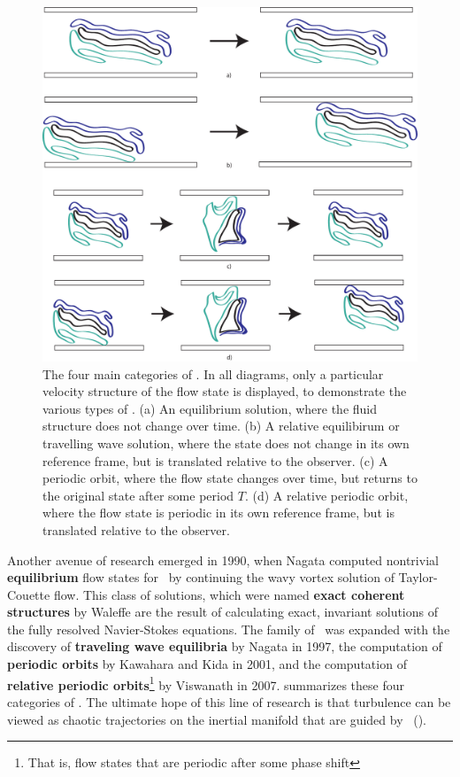 \begin{figure}[h]
\centerline{\includegraphics[scale=0.5]{Figs/ECSClassification}}
\caption{The four main categories of \ecs. In all diagrams, only a particular velocity structure of the flow state is displayed, to demonstrate the various types of \ecs. (a) An {equilibrium} solution, where the fluid structure does not change over time. (b) A {relative equilibirum} or {travelling wave} solution, where the state does not change in its own reference frame, but is translated relative to the observer. (c) A {periodic orbit}, where the flow state changes over time, but returns to the original state after some period $T$. (d) A {relative periodic orbit}, where the flow state is periodic in its own reference frame, but is translated relative to the observer.}\label{fig:ECS}
\end{figure}


Another avenue of research emerged in 1990, when Nagata computed nontrivial {\bf equilibrium} flow states for \pCf\ by continuing the wavy vortex solution of Taylor-Couette flow. This class of solutions, which were named {\bf exact coherent structures} by Waleffe are the result of calculating exact, invariant solutions of the fully resolved Navier-Stokes equations. The family of \ecs\ was expanded with the discovery of {\bf traveling wave equilibria} by Nagata in 1997, the computation of {\bf periodic orbits} by Kawahara and Kida in 2001, and the computation of {\bf relative periodic orbits}\footnote{That is, flow states that are periodic after some phase shift} by Viswanath in 2007.  summarizes these four categories of \ecs. The ultimate hope of this line of research is that turbulence can be viewed as chaotic trajectories on the inertial manifold that are guided by \ecs~(). \\

